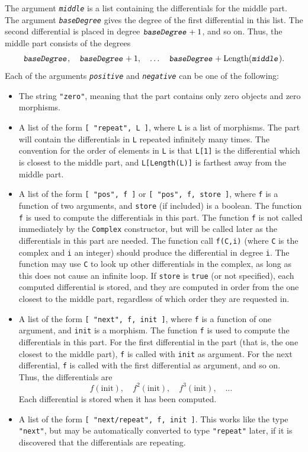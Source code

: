 \documentclass[a4paper,11pt]{report}
\begin{document}
{{{ The argument \mbox{\texttt{\mdseries\slshape middle}} is a list containing the differentials for the middle part. The argument \mbox{\texttt{\mdseries\slshape baseDegree}} gives the degree of the first differential in this list. The second
differential is placed in degree $\mbox{\texttt{\mdseries\slshape baseDegree}}+1$, and so on. Thus, the middle part consists of the degrees 
\[ \mbox{\texttt{\mdseries\slshape baseDegree}},\quad \mbox{\texttt{\mdseries\slshape baseDegree}} + 1,\quad \ldots\quad \mbox{\texttt{\mdseries\slshape baseDegree}} + \text{Length}(\mbox{\texttt{\mdseries\slshape middle}}). \]
 Each of the arguments \mbox{\texttt{\mdseries\slshape positive}} and \mbox{\texttt{\mdseries\slshape negative}} can be one of the following: 
\begin{itemize}
\item The string \texttt{"zero"}, meaning that the part contains only zero objects and zero morphisms.
\item A list of the form \texttt{[ "repeat", L ]}, where \texttt{L} is a list of morphisms. The part will contain the differentials in \texttt{L} repeated infinitely many times. The convention for the order of elements in \texttt{L} is that \texttt{L[1]} is the differential which is closest to the middle part, and \texttt{L[Length(L)]} is farthest away from the middle part.
\item A list of the form \texttt{[ "pos", f ]} or \texttt{[ "pos", f, store ]}, where \texttt{f} is a function of two arguments, and \texttt{store} (if included) is a boolean. The function \texttt{f} is used to compute the differentials in this part. The function \texttt{f} is not called immediately by the \texttt{Complex} constructor, but will be called later as the differentials in this part are
needed. The function call \texttt{f(C,i)} (where \texttt{C} is the complex and \texttt{i} an integer) should produce the differential in degree \texttt{i}. The function may use \texttt{C} to look up other differentials in the complex, as long as this does not cause
an infinite loop. If \texttt{store} is \texttt{true} (or not specified), each computed differential is stored, and they are
computed in order from the one closest to the middle part, regardless of which
order they are requested in.
\item A list of the form \texttt{[ "next", f, init ]}, where \texttt{f} is a function of one argument, and \texttt{init} is a morphism. The function \texttt{f} is used to compute the differentials in this part. For the first differential
in the part (that is, the one closest to the middle part), \texttt{f} is called with \texttt{init} as argument. For the next differential, \texttt{f} is called with the first differential as argument, and so on. Thus, the
differentials are 
\[ f(\text{init}),\quad f^2(\text{init}),\quad f^3(\text{init}),\quad \ldots \]
 Each differential is stored when it has been computed. 
\item A list of the form \texttt{[ "next/repeat", f, init ]}. This works like the type \texttt{"next"}, but may be automatically converted to type \texttt{"repeat"} later, if it is discovered that the differentials are repeating. 
\end{itemize}
 }

}}
\end{document}

